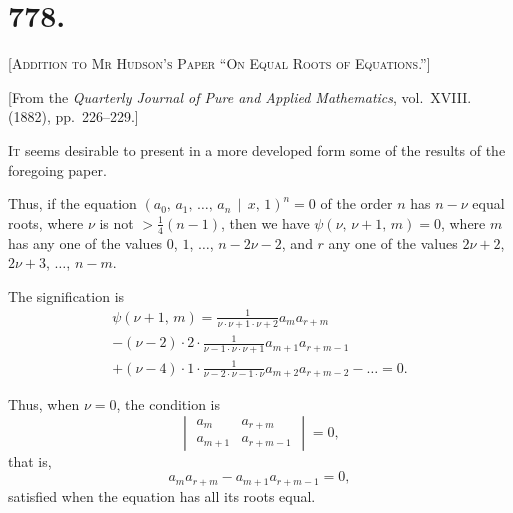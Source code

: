 \documentclass[11pt,a4paper]{book}
\begin{document}
\newpage

\section*{778.}

\begin{center}
\Large\scshape [Addition to Mr Hudson's Paper ``On Equal Roots of Equations.'']
\end{center}

\begin{center}
[From the \textit{Quarterly Journal of Pure and Applied Mathematics}, vol.~XVIII. (1882), pp.~226--229.]
\end{center}

\textsc{It} seems desirable to present in a more developed form some of the results of the foregoing paper.

Thus, if the equation $(a_{0},\, a_{1},\, \dots,\, a_{n} \,\!\!\mid\!\!\, x,\, 1)^{n} = 0$ of the order $n$ has $n-\nu$ equal roots, where $\nu$ is not $> \frac{1}{4}(n-1)$, then we have $\psi(\nu,\, \nu+1,\, m) = 0$, where $m$ has any one of the values $0$, $1$, $\dots$, $n-2\nu-2$, and $r$ any one of the values $2\nu+2$, $2\nu+3$, $\dots$, $n-m$.

The signification is
\begin{multline*}
\psi(\nu+1,\, m) = \frac{1}{\nu \cdot \nu+1 \cdot \nu+2} a_{m}a_{r+m} \\
- (\nu-2) \cdot 2 \cdot \frac{1}{\nu-1 \cdot \nu \cdot \nu+1} a_{m+1}a_{r+m-1} \\
+ (\nu-4) \cdot 1 \cdot \frac{1}{\nu-2 \cdot \nu-1 \cdot \nu} a_{m+2}a_{r+m-2} - \dots = 0.
\end{multline*}

Thus, when $\nu=0$, the condition is
\[
\begin{vmatrix}
a_{m} & a_{r+m} \\
a_{m+1} & a_{r+m-1}
\end{vmatrix} = 0,
\]
that is,
\[
a_{m}a_{r+m} - a_{m+1}a_{r+m-1} = 0,
\]
satisfied when the equation has all its roots equal.
\end{document}
